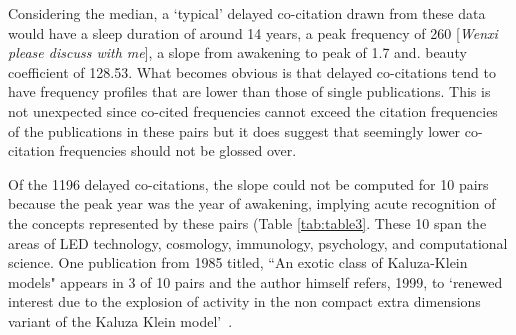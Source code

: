 \documentclass[utf8]{frontiersSCNS}
\begin{document}
Considering the median, a `typical' delayed co-citation drawn from these data would have a sleep duration of around 14 years, a peak frequency of 260 [\emph{Wenxi please discuss with me}], a slope from awakening to peak of 1.7 and. beauty coefficient of 128.53. What becomes obvious is that delayed co-citations tend to have frequency profiles that are lower than those of single publications. This is not unexpected since co-cited frequencies cannot exceed the citation frequencies of the publications in these pairs but it does suggest that seemingly lower co-citation frequencies should not be glossed over.  

Of the 1196 delayed co-citations, the slope could not be computed for 10 pairs because the peak year was the year of awakening, implying acute recognition of the concepts represented by these pairs (Table \ref{tab:table3}. These 10 span the areas of LED technology, cosmology, immunology, psychology, and computational science. One publication from 1985 titled, ``An exotic class of Kaluza-Klein models" appears in 3 of 10 pairs and the author himself refers, 1999, to `renewed interest due to the explosion of activity in the non compact extra dimensions variant of the Kaluza Klein model'~\citep{visser_1999}.
\end{document}
